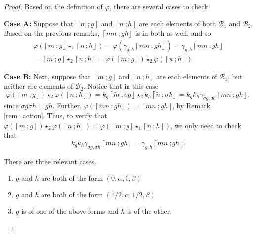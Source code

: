 \documentclass[10pt, letterpaper]{amsart}
\theoremstyle{remark}
\newcommand{\sB}{\mathscr{B}}
\newcommand{\fjrw}[2]{ \left\lceil #1 \:; #2 \right\rfloor }
\DeclareMathOperator{\Hess}{Hess}
\DeclareMathOperator{\Fix}{Fix}
\begin{document}
\begin{proof}
Based on the definition of $\varphi$, there are several cases to check. 

\noindent \textbf{Case A:} Suppose that $\fjrw{m}{g}$ and $\fjrw{n}{h}$ are each elements of both $\sB_1$
and $\sB_2$. Based on the previous remarks, $\fjrw{mn}{gh}$ is in both as well, and so 
\[
\begin{array}{l}
\varphi(\fjrw{m}{g} \star_1 \fjrw{n}{h}) = \varphi( \gamma_{g,h} \fjrw{mn}{gh}) = \gamma_{g,h} \fjrw{mn}{gh} \\
=
\fjrw{m}{g} \star_2 \fjrw{n}{h}=\varphi(\fjrw{m}{g}) \star_2 \varphi(\fjrw{n}{h})
\end{array}
\]

\noindent \textbf{Case B:} Next, suppose that $\fjrw{m}{g}$ and $\fjrw{n}{h}$ are each elements of $\sB_1$, but neither are elements of $\sB_2$.   
Notice that in this case 
\[
\varphi(\fjrw{m}{g}) \star_2 \varphi(\fjrw{ n}{ h})=k_g\fjrw{\tilde m}{\sigma g} \star_2 k_h\fjrw{\tilde n}{\sigma h} = k_gk_h\gamma_{\sigma g, \sigma h} \fjrw{mn}{ gh},
\]
since $\sigma g \sigma h = gh$.  Further, $\varphi( \fjrw{mn}{ gh}) = \fjrw{mn}{ gh}$, by Remark \ref{rem_action}. Thus, to verify that  
$
\varphi(\fjrw{m}{ g}) \star_2  \varphi( \fjrw{n}{ h}) =\varphi(\fjrw{m}{ g} \star_1   \fjrw{n}{ h})$, %
we only need to check that 
\[
k_gk_h\gamma_{\sigma g, \sigma h} \fjrw{mn}{gh}= \gamma_{g, h} \fjrw{mn}{ gh}.
\]


There are three relevant cases. 
\begin{enumerate}
\item $g$ and $h$ are both of the form $(0, \alpha, 0, \beta)$
\item $g$ and $h$ are both of the form $(1/2, \alpha, 1/2, \beta)$
\item $g$ is of one of the above forms and $h$ is of the other.
\end{enumerate}


\end{proof}
\end{document}
